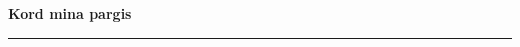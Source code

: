 \documentclass[10pt]{book}
\begin{document}
{
  \samepage
  \raggedbottom
  \raggedright
  \sloppy


  \vspace{0.2in}

  \noindent\begin{minipage}{.1\textwidth}
    \hfill\vspace{0.1in}
  \end{minipage}%
  \noindent\begin{minipage}{.8\textwidth}
    \centering
    \bfseries
    \large Kord mina pargis
  \end{minipage}%
  \noindent\begin{minipage}{.1\textwidth}
      \hfill\vspace{0.1in}
  \end{minipage}

  \nopagebreak[4]
  \vspace{0.1in}
  \nopagebreak[4]
  \hrule height 0.05ex
  \nopagebreak[4]
  \vspace{-0.05in}




}
\end{document}
